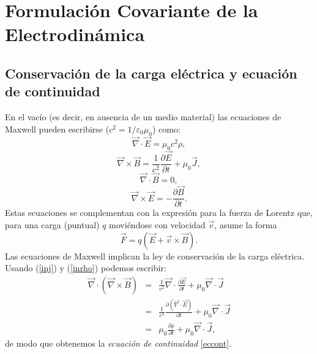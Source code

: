 \chapter{Formulación Covariante de la Electrodinámica}

\section{Conservación de la carga eléctrica y ecuación de continuidad}\label{ccer}

En el vacío (es decir, en ausencia de un medio material) las ecuaciones de Maxwell pueden escribirse ($c^2=1/\varepsilon_0\mu_0$) como:
\begin{equation}\label{inrho}
\vec{\nabla}\cdot \vec{E} = \mu_0 c^2\rho ,
\end{equation}
\begin{equation}\label{inj}
\vec{\nabla}\times \vec{B} = \frac{1}{c^2} \frac{\partial \vec{E}}{\partial t} +\mu_0\vec{J} ,
\end{equation}
\begin{equation}\label{db0}
\vec{\nabla}\cdot \vec{B} =0 ,
\end{equation}
\begin{equation}\label{de+}
\vec{\nabla}\times \vec{E} = - \frac{\partial \vec{B}}{\partial t} .
\end{equation}
Estas ecuaciones se complementan con la expresión para la fuerza de Lorentz que, para una carga (puntual) $q$ moviéndose con velocidad $\vec{v}$, asume la forma
\begin{equation}
\vec{F} = q \left( \vec{E} + \vec{v}\times \vec{B}\right) .
\end{equation}
Las ecuaciones de Maxwell implican la ley de conservación de la carga eléctrica. Usando (\ref{inj}) y (\ref{inrho}) podemos escribir:
\begin{eqnarray}
\vec{\nabla}\cdot (\vec{\nabla}\times \vec{B}) &=& \frac{1}{c^2} \vec{\nabla}\cdot\frac{\partial \vec{E}}{\partial t} + \mu_0 \vec{\nabla}\cdot \vec{J}\\
 &=& \frac{1}{c^2} \frac{\partial (\vec{\nabla}\cdot \vec{E})}{\partial t} +
\mu_0 \vec{\nabla}\cdot \vec{J}\\
&=&\mu_0\frac{\partial \rho}{\partial t} + \mu_0
\vec{\nabla}\cdot \vec{J} ,
\end{eqnarray}
de modo que obtenemos la \textit{ecuación de continuidad} \eqref{eccont}.

